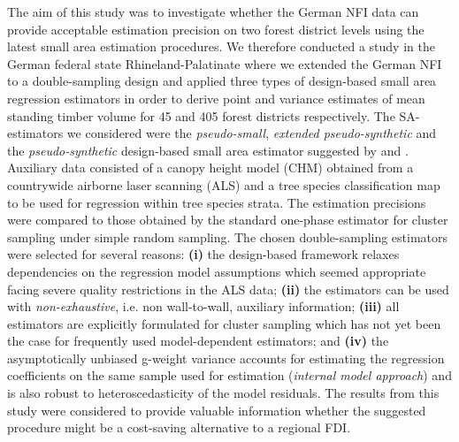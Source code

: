 The aim of this study was to investigate whether the German NFI data can provide acceptable estimation precision on two forest district levels using the latest small area estimation procedures. We therefore conducted a study in the German federal state Rhineland-Palatinate where we extended the German NFI to a double-sampling design and applied three types of design-based small area regression estimators in order to derive point and variance estimates of mean standing timber volume for 45 and 405 forest districts respectively. The SA-estimators we considered were the \textit{pseudo-small}, \textit{extended pseudo-synthetic} and the \textit{pseudo-synthetic} design-based small area estimator suggested by \citet{mandallaz2013a} and \citet{ mandallaz2013b}. Auxiliary data consisted of a canopy height model (CHM) obtained from a countrywide airborne laser scanning (ALS) and a tree species classification map to be used for regression within tree species strata. The estimation precisions were compared to those obtained by the standard one-phase estimator for cluster sampling under simple random sampling. The chosen double-sampling estimators were selected for several reasons: \textbf{(i)} the design-based framework relaxes dependencies on the regression model assumptions which seemed appropriate facing severe quality restrictions in the ALS data; \textbf{(ii)} the estimators can be used with \textit{non-exhaustive}, i.e. non wall-to-wall, auxiliary information; \textbf{(iii)} all estimators are explicitly formulated for cluster sampling which has not yet been the case for frequently used model-dependent estimators; and \textbf{(iv)} the asymptotically unbiased g-weight variance accounts for estimating the regression coefficients on the same sample used for estimation (\textit{internal model approach}) and is also robust to heteroscedasticity of the model residuals. The results from this study were considered to provide valuable information whether the suggested procedure might be a cost-saving alternative to a regional FDI.\par

 


